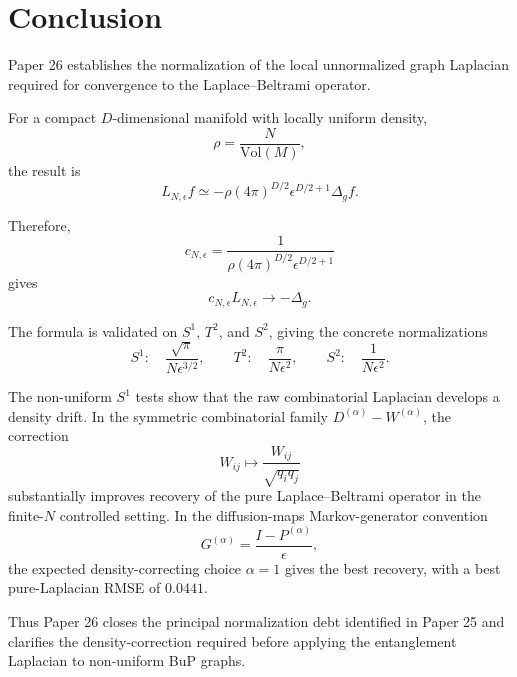 \documentclass[11pt,a4paper]{article}
\newcommand{\Vol}{\mathrm{Vol}}
\begin{document}
\section{Conclusion}

Paper 26 establishes the normalization of the local unnormalized graph
Laplacian required for convergence to the Laplace--Beltrami operator.

For a compact \(D\)-dimensional manifold with locally uniform density,
\begin{equation}
\rho=\frac{N}{\Vol(M)},
\end{equation}
the result is
\begin{equation}
\boxed{
L_{N,\epsilon}f
\simeq
-\rho(4\pi)^{D/2}\epsilon^{D/2+1}\Delta_g f.
}
\end{equation}

Therefore,
\begin{equation}
\boxed{
c_{N,\epsilon}
=
\frac{1}
{\rho(4\pi)^{D/2}\epsilon^{D/2+1}}
}
\end{equation}
gives
\begin{equation}
\boxed{
c_{N,\epsilon}L_{N,\epsilon}\to-\Delta_g.
}
\end{equation}

The formula is validated on \(S^1\), \(T^2\), and \(S^2\), giving the concrete
normalizations
\begin{equation}
S^1:\quad
\frac{\sqrt{\pi}}{N\epsilon^{3/2}},
\qquad
T^2:\quad
\frac{\pi}{N\epsilon^2},
\qquad
S^2:\quad
\frac{1}{N\epsilon^2}.
\end{equation}

The non-uniform \(S^1\) tests show that the raw combinatorial Laplacian
develops a density drift. In the symmetric combinatorial family
\(D^{(\alpha)}-W^{(\alpha)}\), the correction
\[
W_{ij}\mapsto\frac{W_{ij}}{\sqrt{q_iq_j}}
\]
substantially improves recovery of the pure Laplace--Beltrami operator in the
finite-\(N\) controlled setting. In the diffusion-maps Markov-generator
convention
\[
G^{(\alpha)}=\frac{I-P^{(\alpha)}}{\epsilon},
\]
the expected density-correcting choice \(\alpha=1\) gives the best recovery,
with a best pure-Laplacian RMSE of \(0.0441\).

Thus Paper 26 closes the principal normalization debt identified in Paper 25
and clarifies the density-correction required before applying the entanglement
Laplacian to non-uniform BuP graphs.
\end{document}
